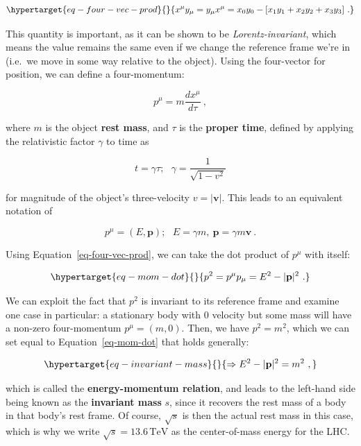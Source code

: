 \documentclass[
  11pt,
  numbers=noendperiod]{book}
\begin{document}
\begin{equation}\protect\hypertarget{eq-four-vec-prod}{}{
x^\mu y_\mu = y_\mu x^\mu  = x_0y_0 - [x_1y_1 + x_2y_2 + x_3y_3]~.
}\label{eq-four-vec-prod}\end{equation}

This quantity is important, as it can be shown to be
\emph{Lorentz-invariant}, which means the value remains the same even if
we change the reference frame we're in (i.e.~we move in some way
relative to the object). Using the four-vector for position, we can
define a four-momentum:

\[
p^\mu = m \frac{dx^\mu}{d\tau}~,
\]

where \(m\) is the object \textbf{rest mass}, and \(\tau\) is the
\textbf{proper time}, defined by applying the relativistic factor
\(\gamma\) to time as

\[
t = \gamma\tau;~~~ \gamma = \frac{1}{\sqrt{1-v^2}}
\]

for magnitude of the object's three-velocity \(v = |\mathbf{v}|\). This
leads to an equivalent notation of

\[
p^\mu = (E, \mathbf{p}); ~~~ E=\gamma m,~\mathbf{p}=\gamma m \mathbf{v}~.
\]

Using Equation~\ref{eq-four-vec-prod}, we can take the dot product of
\(p^\mu\) with itself:

\begin{equation}\protect\hypertarget{eq-mom-dot}{}{
p^2 = p^\mu p_\mu = E^2 - |\mathbf{p}|^2~.
}\label{eq-mom-dot}\end{equation}

We can exploit the fact that \(p^2\) is invariant to its reference frame
and examine one case in particular: a stationary body with 0 velocity
but some mass will have a non-zero four-momentum \(p^\mu = (m, 0)\).
Then, we have \(p^2 = m^2\), which we can set equal to
Equation~\ref{eq-mom-dot} that holds generally:

\begin{equation}\protect\hypertarget{eq-invariant-mass}{}{
\Rightarrow E^2 - |\mathbf{p}|^2 = m^2~,
}\label{eq-invariant-mass}\end{equation}

which is called the \textbf{energy-momentum relation}, and leads to the
left-hand side being known as the \textbf{invariant mass} \(s\), since
it recovers the rest mass of a body in that body's rest frame. Of
course, \(\sqrt{s}\) is then the actual rest mass in this case, which is
why we write \(\sqrt{s} = 13.6 \, \text{TeV}\) as the center-of-mass
energy for the LHC.
\end{document}
